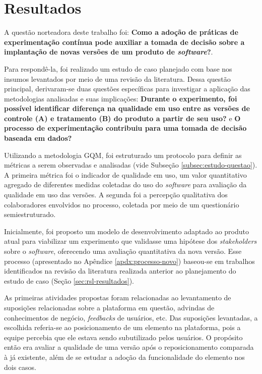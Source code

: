 \section{Resultados}
\label{subsec:resultados}
A questão norteadora deste trabalho foi: \textbf{Como a adoção de práticas de experimentação contínua pode auxiliar a tomada de decisão sobre a implantação de novas versões de um produto de \textit{software}?}.

Para respondê-la, foi realizado um estudo de caso planejado com base nos insumos levantados por meio de uma revisão da literatura. Dessa questão principal, derivaram-se duas questões específicas para investigar a aplicação das metodologias analisadas e suas implicações: \textbf{Durante o experimento, foi possível identificar diferença na qualidade em uso entre as versões de controle (A) e tratamento (B) do produto a partir de seu uso?} e \textbf{O processo de experimentação contribuiu para uma tomada de decisão baseada em dados?}

Utilizando a metodologia GQM, foi estruturado um protocolo para definir as métricas a serem observadas e analisadas (vide Subseção \ref{subsec:estudo-questao}). A primeira métrica foi o indicador de qualidade em uso, um valor quantitativo agregado de diferentes medidas coletadas do uso do \textit{software} para avaliação da qualidade em uso das versões. A segunda foi a percepção qualitativa dos colaboradores envolvidos no processo, coletada por meio de um questionário semiestruturado.

Inicialmente, foi proposto um modelo de desenvolvimento adaptado ao produto atual para viabilizar um experimento que validasse uma hipótese dos \textit{stakeholders} sobre o \textit{software}, oferecendo uma avaliação quantitativa da nova versão. Esse processo (apresentado no Apêndice \ref{apdx:processo-novo}) baseou-se em trabalhos identificados na revisão da literatura realizada anterior ao planejamento do estudo de caso (Seção \ref{sec:rsl-resultados}).

As primeiras atividades propostas foram relacionadas ao levantamento de suposições relacionadas sobre a plataforma em questão, advindas de conhecimentos de negócio, \textit{feedbacks} de usuários, etc. Das suposições levantadas, a escolhida referia-se ao posicionamento de um elemento na plataforma, pois a equipe percebia que ele estava sendo subutilizado pelos usuários. O propósito então era avaliar a qualidade de uma versão após o reposicionamento comparada à já existente, além de se estudar a adoção da funcionalidade do elemento nos dois casos.

